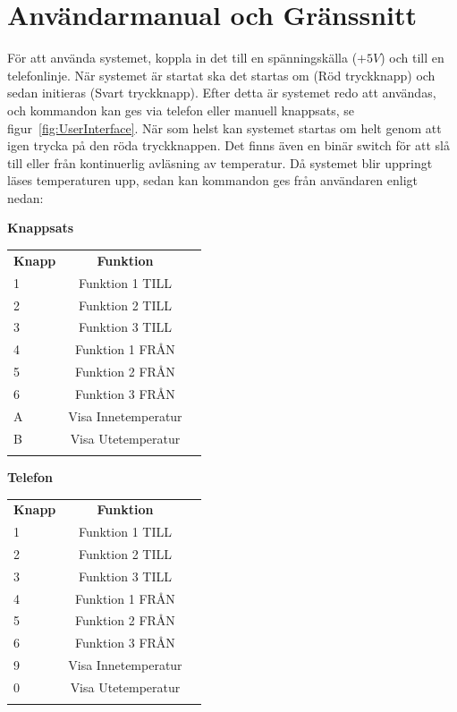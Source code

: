 \documentclass[a4paper,11pt]{article}
\begin{document}
	\addappheadtotoc

	\section{Användarmanual och Gränssnitt}
	\label{sec:Manual}
	För att använda systemet, koppla in det till en spänningskälla ($+5V$) och till en telefonlinje.
	När systemet är startat ska det startas om (Röd tryckknapp) och sedan initieras (Svart tryckknapp).
	Efter detta är systemet redo att användas, och kommandon kan ges via telefon eller manuell knappsats, se figur~\ref{fig:UserInterface}.
	När som helst kan systemet startas om helt genom att igen trycka på den röda tryckknappen. Det finns även en binär switch för
	att slå till eller från kontinuerlig avläsning av temperatur.
	Då systemet blir uppringt läses temperaturen upp, sedan kan kommandon ges från användaren enligt nedan:\\

	\begin{table}[ht]
		\begin{minipage}[b]{0.5\linewidth}\centering
			{\bf Knappsats}\\
			\begin{tabular}{l c r}
				\\{\bf Knapp} & {\bf Funktion}\\
				1 & Funktion 1 TILL\\		
				2 & Funktion 2 TILL\\		
				3 & Funktion 3 TILL\\
				4 & Funktion 1 FRÅN\\	
				5 & Funktion 2 FRÅN\\
				6 & Funktion 3 FRÅN\\		
				A & Visa Innetemperatur\\
				B & Visa Utetemperatur \\\\
			\end{tabular}
	 	\end{minipage}
	 	\hspace{0.5cm}
	 	\begin{minipage}[b]{0.5\linewidth}
			\centering
			{\bf Telefon}\\
			\begin{tabular}{l c r}
				\\{\bf Knapp} & {\bf Funktion}\\
				1 & Funktion 1 TILL\\		
				2 & Funktion 2 TILL\\		
				3 & Funktion 3 TILL\\
				4 & Funktion 1 FRÅN\\	
				5 & Funktion 2 FRÅN\\
				6 & Funktion 3 FRÅN\\
				9 & Visa Innetemperatur\\
				0 & Visa Utetemperatur \\\\
			\end{tabular}
	 	\end{minipage}
	\end{table}
\end{document}
